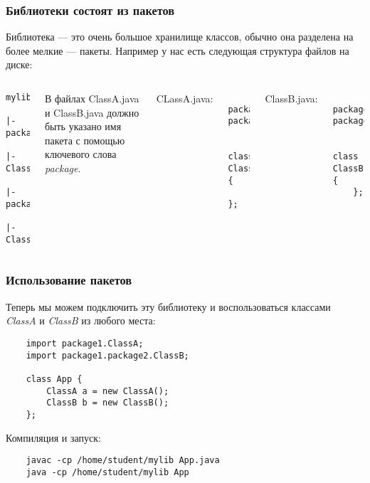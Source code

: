 \begin{frame}[fragile]
	\frametitle{Библиотеки состоят из пакетов}

	Библиотека --- это очень большое хранилище классов, обычно она разделена на более мелкие --- пакеты.
	Например у нас есть следующая структура файлов на диске:
	\medskip
	\begin{columns}[c]
	\column{2.0in}
	\begin{verbatim}
mylib
   |-package1
       |-ClassA.java
       |-package2
          |-ClassB.java
	\end{verbatim}
	\medskip
	\begin{small}
	В файлах ClassA.java и ClassB.java должно быть указано имя пакета с помощью ключевого слова \emph{package}.
	\end{small}
	\column{2.45in}
	CLassA.java:
	\begin{verbatim}
	package package1;

	class ClassA {
	};
	\end{verbatim}

	ClassB.java:
	\begin{verbatim}
	package package1.package2;

	class ClassB {
	};
	\end{verbatim}
	\end{columns}
\end{frame}

\begin{frame}[fragile]
	\frametitle{Использование пакетов}
	\begin{large}
	Теперь мы можем подключить эту библиотеку и воспользоваться классами \emph{ClassA} и \emph{ClassB} из любого места:
	\medskip

	\begin{verbatim}
	import package1.ClassA;
	import package1.package2.ClassB;

	class App {
	    ClassA a = new ClassA();
	    ClassB b = new ClassB();
	};
	\end{verbatim}

	Компиляция и запуск:
	\begin{verbatim}
	javac -cp /home/student/mylib App.java
	java -cp /home/student/mylib App
	\end{verbatim}
	\end{large}

\end{frame}

